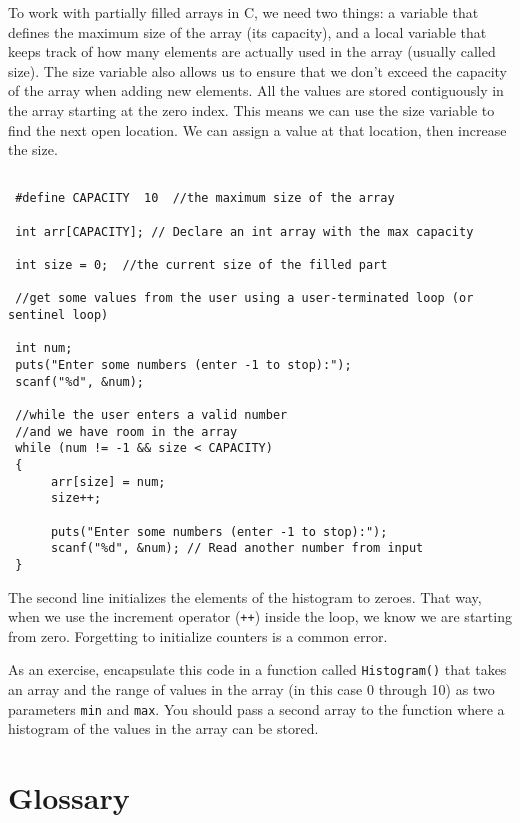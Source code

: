 To work with partially filled arrays in C, we need two things: a variable that defines the maximum size of the array (its capacity), and a local variable that keeps track of how many elements are actually used in the array (usually called size). The size variable also allows us to ensure that we don't exceed the capacity of the array when adding new elements. All the values are stored contiguously in the array starting at the zero index. This means we can use the size variable to find the next open location. We can assign a value at that location, then increase the size.

\begin{verbatim}

 #define CAPACITY  10  //the maximum size of the array

 int arr[CAPACITY]; // Declare an int array with the max capacity 

 int size = 0;  //the current size of the filled part

 //get some values from the user using a user-terminated loop (or sentinel loop)

 int num;
 puts("Enter some numbers (enter -1 to stop):");
 scanf("%d", &num);

 //while the user enters a valid number 
 //and we have room in the array
 while (num != -1 && size < CAPACITY) 
 {
	  arr[size] = num; 	
	  size++;  

	  puts("Enter some numbers (enter -1 to stop):");
	  scanf("%d", &num); // Read another number from input
 }
\end{verbatim}
%
The second line initializes the elements of the histogram to
zeroes.  That way, when we use the increment
operator ({\tt ++}) inside the loop, we know we are starting from zero.
Forgetting to initialize counters is a common error.

As an exercise, encapsulate this code in a function called {\tt Histogram()} 
that takes an array and the range of values in the array
(in this case 0 through 10) as two parameters \texttt{min} and \texttt{max}. 
You should pass a second array to the function where a histogram of the
values in the array can be stored.

\section{Glossary}

